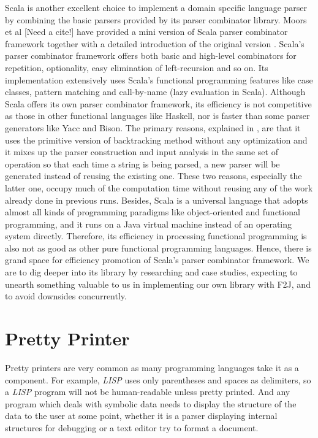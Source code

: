Scala is another excellent choice to implement a domain specific language parser by combining the basic parsers provided by its parser combinator library. Moors et al [Need a cite!] have provided a mini version of Scala parser combinator framework together with a detailed introduction of the original version \cite{Moors:2008}. Scala's parser combinator framework offers both basic and high-level combinators for repetition, optionality, easy elimination of left-recursion and so on. Its implementation extensively uses Scala's functional programming features like case classes, pattern matching and call-by-name (lazy evaluation in Scala). Although Scala offers its own parser combinator framework, its efficiency is not competitive as those in other functional languages like Haskell, nor is faster than some parser generators like Yacc and Bison. The primary reasons, explained in \cite{Scala:2008}, are that it uses the primitive version of backtracking method without any optimization and it mixes up the parser construction and input analysis in the same set of operation so that each time a string is being parsed, a new parser will be generated instead of reusing the existing one. These two reasons, especially the latter one, occupy much of the computation time without reusing any of the work already done in previous runs.  Besides, Scala is a universal language that adopts almost all kinds of programming paradigms like object-oriented and functional programming, and it runs on a Java virtual machine instead of an operating system directly. Therefore, its efficiency in processing functional programming is also not as good as other pure functional programming languages. Hence, there is grand space for efficiency promotion of Scala's parser combinator framework. We are to dig deeper into its library by researching and case studies, expecting to unearth something valuable to us in implementing our own library with F2J, and to avoid downsides concurrently.

\section{Pretty Printer}

Pretty printers are very common as many programming languages take it as a component. For example, \textit{LISP} uses only parentheses and spaces as delimiters, so a \textit{LISP} program will not be human-readable unless pretty printed. And any program which deals with symbolic data needs to display the structure of the data to the user at some point, whether it is a parser displaying internal structures for debugging or a text editor try to format a document.

